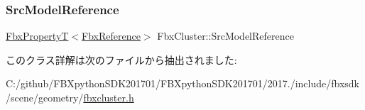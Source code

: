 \mbox{\label{class_fbx_cluster_a7d34c8c9e6e527382c2bf2530a9df609}} 
\subsubsection{\texorpdfstring{Src\+Model\+Reference}{SrcModelReference}}
{\footnotesize\ttfamily \hyperlink{class_fbx_property_t}{Fbx\+PropertyT}$<$\hyperlink{fbxtypes_8h_a44df6a2eec915cf27cd481e5c5e48a24}{Fbx\+Reference}$>$ Fbx\+Cluster\+::\+Src\+Model\+Reference\hspace{0.3cm}{\ttfamily [protected]}}



このクラス詳解は次のファイルから抽出されました\+:\begin{DoxyCompactItemize}
\item 
C\+:/github/\+F\+B\+Xpython\+S\+D\+K201701/\+F\+B\+Xpython\+S\+D\+K201701/2017./include/fbxsdk/scene/geometry/\hyperlink{fbxcluster_8h}{fbxcluster.\+h}\end{DoxyCompactItemize}
